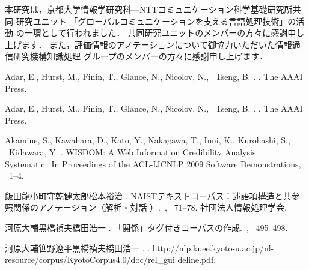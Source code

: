 \documentclass[japanese]{jnlp_JS2.0}
\begin{document}
\acknowledgment

本研究は，京都大学情報学研究科—NTTコミュニケーション科学基礎研究所共同
研究ユニット 「グローバルコミュニケーションを支える言語処理技術」の活動
の一環として行われました．
共同研究ユニットのメンバーの方々に感謝申し上げます．
また，評価情報のアノテーションについて御協力いただいた情報通信研究機構知識処理
グループのメンバーの方々に感謝申し上げます．




\begin{thebibliography}{}

Adar, E., Hurst, M., Finin, T., Glance, N., Nicolov, N., \BBA\ Tseng, B. \BBCP.
.
\newblock The AAAI Press.

Adar, E., Hurst, M., Finin, T., Glance, N., Nicolov, N., \BBA\ Tseng, B. \BBCP.
.
\newblock The AAAI Press.

Akamine, S., Kawahara, D., Kato, Y., Nakagawa, T., Inui, K., Kurohashi, S.,
  \BBA\ Kidawara, Y. \BBCP.
\newblock \BBOQ WISDOM: A Web Information Credibility Analysis
  Systematic.\BBCQ\
\newblock In {\Bem Proceedings of the ACL-IJCNLP 2009 Software Demonstrations},
  \mbox{\BPGS\ 1--4}.

飯田龍\JBA 小町守\JBA 乾健太郎\JBA 松本裕治 \BBCP.
\newblock
  {NAIST}テキストコーパス：述語項構造と共参照関係のアノテーション（解析・対話
）\inhibitglue.\
\newblock {}, \mbox{\BPGS\
  71--78}. 社団法人情報処理学会.

河原大輔\JBA 黒橋禎夫\JBA 橋田浩一 \BBCP.
\newblock 「関係」タグ付きコーパスの作成.\
\newblock {}, \mbox{\BPGS\ 495--498}.

河原大輔\JBA 笹野遼平\JBA 黒橋禎夫\JBA 橋田浩一 \BBOP 2005\BBCP.
\newblock {}.
\newblock
  http://nlp.kuee.kyoto-u.ac.jp/nl-resource/corpus/KyotoCorpus4.0/doc/rel\_gui
deline.pdf.


\end{thebibliography}
\end{document}
